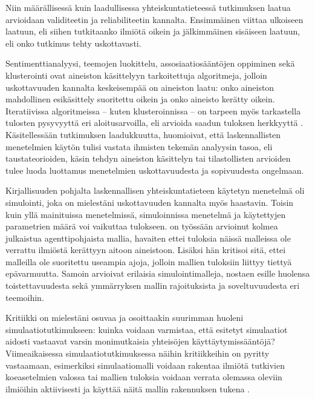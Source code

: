 \documentclass[finnish,gradu,twoside,12pt]{tktltiki}
\begin{document}
{Niin määrällisessä kuin laadullisessa yhteiskuntatieteessä tutkimuksen laatua arvioidaan validiteetin ja reliabiliteetin kannalta. Ensimmäinen viittaa ulkoiseen laatuun, eli siihen tutkitaanko ilmiötä oikein ja jälkimmäinen sisäiseen laatuun, eli onko tutkimus tehty uskottavasti.

Sentimenttianalyysi, teemojen luokittelu, assosiaatiosääntöjen oppiminen sekä klusterointi ovat aineiston käsittelyyn tarkoitettuja algoritmeja, jolloin uskottavuuden kannalta keskeisempää on aineiston laatu: onko aineiston mahdollinen esikäsittely suoritettu oikein ja onko aineisto kerätty oikein. Iteratiivissa algoritmeissa -- kuten klusteroinnissa -- on tarpeen myös tarkastella tulosten pysyvyyttä eri aloitusarvoilla, eli arvioida saadun tuloksen herkkyyttä \citep[esimerkiksi][]{pardos2010navigating}. Käsitellessään tutkimuksen laadukkuutta, \citet{Grimmer2013} huomioivat, että laskennallisten menetelmien käytön tulisi vastata ihmisten tekemän analyysin tasoa, eli taustateorioiden, käsin tehdyn aineiston käsittelyn tai tilastollisten arvioiden tulee luoda luottamus menetelmien uskottavuudesta ja sopivuudesta ongelmaan.

Kirjallisuuden pohjalta laskennallisen yhteiskuntatieteen käytetyn menetelmä oli simulointi, joka on mielestäni uskottavuuden kannalta myös haastavin. Toisin kuin yllä mainituissa menetelmissä, simuloinnissa menetelmä ja käytettyjen parametrien määrä voi vaikuttaa tulokseen. \citet{bloomquist2006comparison} on työssään arvioinut kolmea julkaistua agenttipohjaista mallia, havaiten ettei tuloksia näissä malleissa ole verrattu ilmiöstä kerättyyn aitoon aineistoon. Lisäksi  hän kritisoi sitä, ettei malleilla ole suoritettu useampia ajoja, jolloin mallien tuloksiin liittyy tiettyä epävarmuutta. Samoin \citet{edmonds2005computational} arvioivat erilaisia simulointimalleja, nostaen esille huolensa toistettavuudesta sekä ymmärryksen mallin rajoituksista ja soveltuvuudesta eri teemoihin.

Kritiikki on mielestäni osuvaa ja osoittaakin suurimman huoleni simulaatiotutkimukseen: kuinka voidaan varmistaa, että esitetyt simulaatiot aidosti vastaavat varsin monimutkaisia yhteisöjen käyttäytymissääntöjä? Viimeaikaisessa simulaatiotutkimuksessa näihin kritiikkeihin on pyritty vastaamaan, esimerkiksi simulaatiomalli voidaan rakentaa ilmiötä tutkivien koeasetelmien valossa \citep{Villatoro2013} tai mallien tuloksia voidaan verrata olemassa oleviin ilmiöihin aktiivisesti ja käyttää näitä mallin rakennuksen tukena \citep{Pearson2011}.

}
\end{document}
